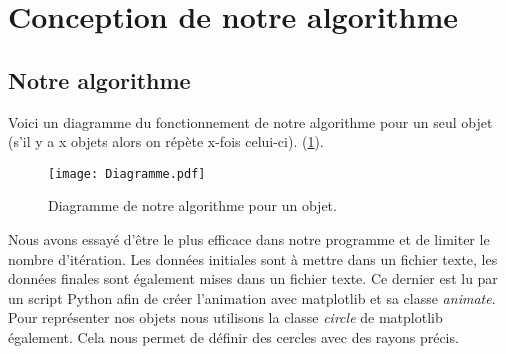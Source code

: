 \section{Conception de notre algorithme}
    \subsection{Notre algorithme}
        Voici un diagramme du fonctionnement de notre algorithme pour un seul objet (s'il y a x objets alors on répète x-fois celui-ci). (\ref{diag:algorithme}).
        \begin{figure}[H]
            \centering
            \texttt{[image: Diagramme.pdf]}
            \caption{Diagramme de notre algorithme pour un objet.}
            \label{diag:algorithme}
        \end{figure} 

        Nous avons essayé d'être le plus efficace dans notre programme et de limiter le nombre d'itération. Les données initiales sont à mettre dans un fichier texte, les données finales sont également mises dans un fichier texte. Ce dernier est lu par un script Python afin de créer l'animation avec matplotlib et sa classe \textit{animate}. Pour représenter nos objets nous utilisons la classe \textit{circle} de matplotlib également. Cela nous permet de définir des cercles avec des rayons précis.
    
